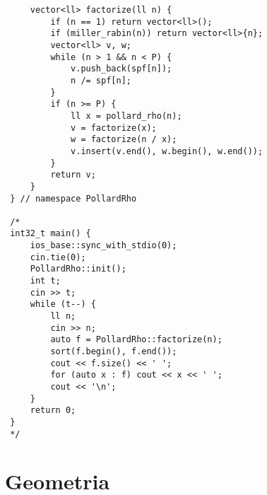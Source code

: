 \documentclass[11pt, a4paper, twoside]{article}
\begin{document}
\begin{lstlisting}
     vector<ll> factorize(ll n) {
         if (n == 1) return vector<ll>();
         if (miller_rabin(n)) return vector<ll>{n};
         vector<ll> v, w;
         while (n > 1 && n < P) {
             v.push_back(spf[n]);
             n /= spf[n];
         }
         if (n >= P) {
             ll x = pollard_rho(n);
             v = factorize(x);
             w = factorize(n / x);
             v.insert(v.end(), w.begin(), w.end());
         }
         return v;
     }
 } // namespace PollardRho
 
 /*
 int32_t main() {
     ios_base::sync_with_stdio(0);
     cin.tie(0);
     PollardRho::init();
     int t;
     cin >> t;
     while (t--) {
         ll n;
         cin >> n;
         auto f = PollardRho::factorize(n);
         sort(f.begin(), f.end());
         cout << f.size() << ' ';
         for (auto x : f) cout << x << ' ';
         cout << '\n';
     }
     return 0;
 }
 */
\end{lstlisting}

\clearpage


%
%

\section{Geometria}
\end{document}
